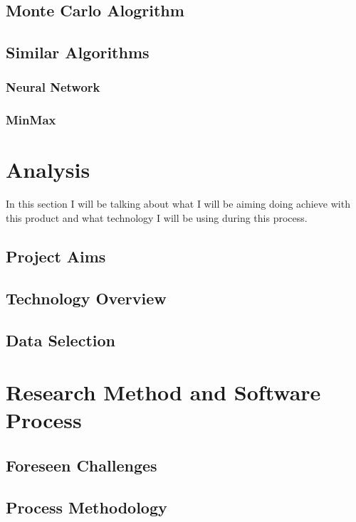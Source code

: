 \subsection {Monte Carlo Alogrithm}

\subsection{Similar Algorithms}

\subsubsection{Neural Network}

\subsubsection{MinMax}


\section{Analysis}
In this section I will be talking about what I will be aiming doing achieve with this product and what technology I will be using during this process. 
\subsection{Project Aims}

\subsection {Technology Overview}
\subsection{ Data Selection}

\section{Research Method and Software Process}
\subsection {Foreseen Challenges}
\subsection {Process Methodology}